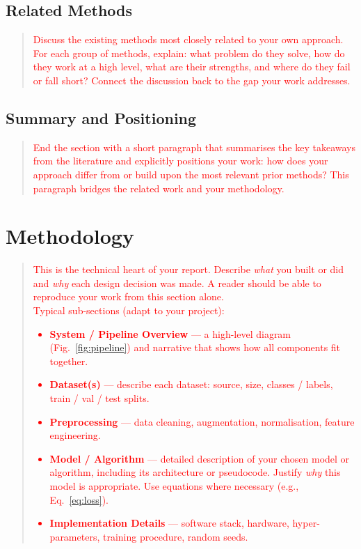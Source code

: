 \documentclass[journal, 10pt, twoside]{IEEEtran}
\begin{document}
\subsection{Related Methods}
\label{ssec:related_methods}

\begin{quote}
  \textcolor{red}{%
    Discuss the existing methods most closely related to your own approach. For each group of methods, explain: what problem do they solve, how do they work at a high level, what are their strengths, and where do they fail or fall short?  Connect the discussion back to the gap your work addresses.%
  }
\end{quote}

\subsection{Summary and Positioning}
\label{ssec:summary_rw}

\begin{quote}
  \textcolor{red}{%
    End the section with a short paragraph that summarises the key takeaways from the literature and explicitly positions your work: how does your approach differ from or build upon the most relevant prior methods? This paragraph bridges the related work and your methodology.%
  }
\end{quote}

\section{Methodology}
\label{sec:methodology}

\begin{quote}
  \textcolor{red}{%
    This is the technical heart of your report.  Describe \emph{what} you built or did and \emph{why} each design decision was made.  A reader should be able to reproduce your work from this section alone.\\[4pt]
    Typical sub-sections (adapt to your project):%
    \begin{itemize}
      \item \textbf{System / Pipeline Overview} --- a high-level diagram (Fig.~\ref{fig:pipeline}) and narrative that shows how all components fit together.
      \item \textbf{Dataset(s)} --- describe each dataset: source, size, classes / labels, train / val / test splits.
      \item \textbf{Preprocessing} --- data cleaning, augmentation, normalisation, feature engineering.
      \item \textbf{Model / Algorithm} --- detailed description of your chosen model or algorithm, including its architecture or pseudocode.  Justify \emph{why} this model is appropriate. Use equations where necessary (e.g., Eq.~\ref{eq:loss}).
      \item \textbf{Implementation Details} --- software stack, hardware, hyper-parameters, training procedure, random seeds.
    \end{itemize}%
  }
\end{quote}
\end{document}
